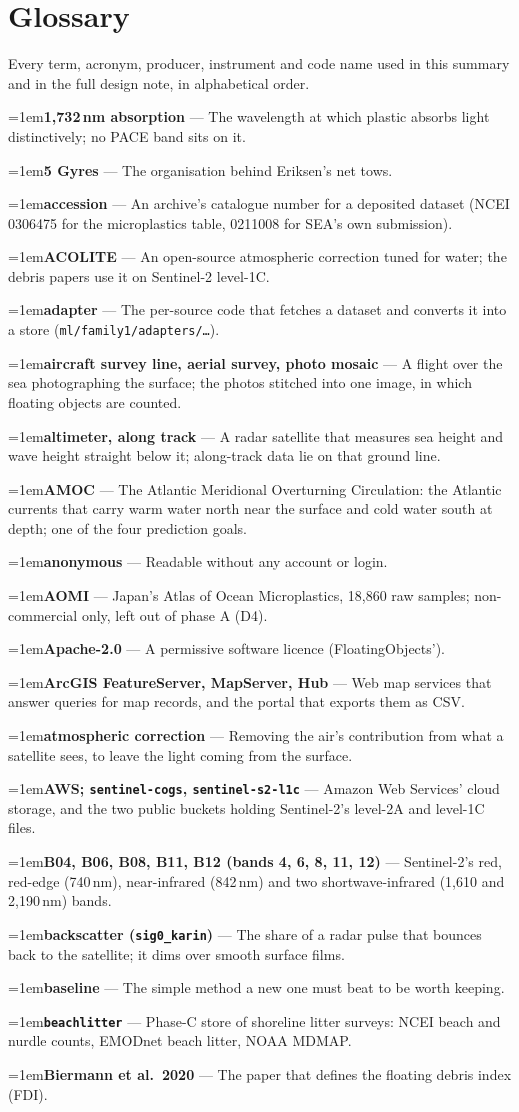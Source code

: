 \documentclass[10pt]{article}
\newcommand{\code}[1]{\texttt{#1}}
\newcommand{\gl}[2]{\par\hangindent=1em\hangafter=1\textbf{#1} --- #2\par}
\begin{document}
\section*{Glossary}
Every term, acronym, producer, instrument and code name used in this summary and in the full design note, in
alphabetical order.
\small
\gl{1,732\,nm absorption}{The wavelength at which plastic absorbs light distinctively; no PACE band sits on it.}
\gl{5 Gyres}{The organisation behind Eriksen's net tows.}
\gl{accession}{An archive's catalogue number for a deposited dataset (NCEI 0306475 for the microplastics table, 0211008 for SEA's own submission).}
\gl{ACOLITE}{An open-source atmospheric correction tuned for water; the debris papers use it on Sentinel-2 level-1C.}
\gl{adapter}{The per-source code that fetches a dataset and converts it into a store (\code{ml/family1/adapters/\dots}).}
\gl{aircraft survey line, aerial survey, photo mosaic}{A flight over the sea photographing the surface; the photos stitched into one image, in which floating objects are counted.}
\gl{altimeter, along track}{A radar satellite that measures sea height and wave height straight below it; along-track data lie on that ground line.}
\gl{AMOC}{The Atlantic Meridional Overturning Circulation: the Atlantic currents that carry warm water north near the surface and cold water south at depth; one of the four prediction goals.}
\gl{anonymous}{Readable without any account or login.}
\gl{AOMI}{Japan's Atlas of Ocean Microplastics, 18,860 raw samples; non-commercial only, left out of phase A (D4).}
\gl{Apache-2.0}{A permissive software licence (FloatingObjects').}
\gl{ArcGIS FeatureServer, MapServer, Hub}{Web map services that answer queries for map records, and the portal that exports them as CSV.}
\gl{atmospheric correction}{Removing the air's contribution from what a satellite sees, to leave the light coming from the surface.}
\gl{AWS; \code{sentinel-cogs}, \code{sentinel-s2-l1c}}{Amazon Web Services' cloud storage, and the two public buckets holding Sentinel-2's level-2A and level-1C files.}
\gl{B04, B06, B08, B11, B12 (bands 4, 6, 8, 11, 12)}{Sentinel-2's red, red-edge (740\,nm), near-infrared (842\,nm) and two shortwave-infrared (1,610 and 2,190\,nm) bands.}
\gl{backscatter (\code{sig0\_karin})}{The share of a radar pulse that bounces back to the satellite; it dims over smooth surface films.}
\gl{baseline}{The simple method a new one must beat to be worth keeping.}
\gl{\code{beachlitter}}{Phase-C store of shoreline litter surveys: NCEI beach and nurdle counts, EMODnet beach litter, NOAA MDMAP.}
\gl{Biermann et al.\ 2020}{The paper that defines the floating debris index (FDI).}
\end{document}
